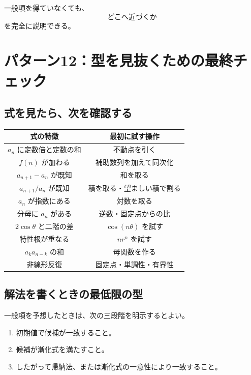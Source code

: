 一般項を得ていなくても、
\[
  \text{どこへ近づくか}
\]
を完全に説明できる。

\section{パターン12：型を見抜くための最終チェック}

\subsection{式を見たら、次を確認する}

\begin{center}
  \begin{tabular}{c|c}
    式の特徴                & 最初に試す操作             \\ \hline
    $a_n$ に定数倍と定数の和     & 不動点を引く              \\
    $f(n)$ が加わる         & 補助数列を加えて同次化         \\
    $a_{n+1}-a_n$ が既知   & 和を取る                \\
    $a_{n+1}/a_n$ が既知   & 積を取る・望ましい積で割る       \\
    $a_n$ が指数にある        & 対数を取る               \\
    分母に $a_n$ がある       & 逆数・固定点からの比          \\
    $2\cos\theta$ と二階の差 & $\cos(n\theta)$ を試す \\
    特性根が重なる             & $n r^n$ を試す         \\
    $a_ka_{n-k}$ の和     & 母関数を作る              \\
    非線形反復               & 固定点・単調性・有界性         \\
  \end{tabular}
\end{center}

\subsection{解法を書くときの最低限の型}

一般項を予想したときは、次の三段階を明示するとよい。

\begin{enumerate}
  \item 初期値で候補が一致すること。
  \item 候補が漸化式を満たすこと。
  \item したがって帰納法、または漸化式の一意性により一致すること。
\end{enumerate}

